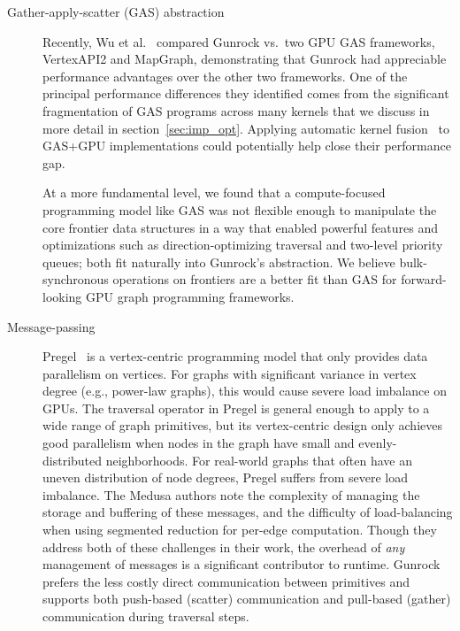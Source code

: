 \documentclass[format=acmsmall,review=false,screen=true]{acmart}
\begin{document}
\begin{description}
\item[Gather-apply-scatter (GAS) abstraction] Recently, Wu et
  al.~\cite{Wu:2015:PCF} compared Gunrock vs.\ two GPU GAS frameworks,
  VertexAPI2 and MapGraph, demonstrating that Gunrock had appreciable
  performance advantages over the other two frameworks. One of the
  principal performance differences they identified comes from the
  significant fragmentation of GAS programs across many kernels that
  we discuss in more detail in section~\ref{sec:imp_opt}. Applying
  automatic kernel fusion~\cite{Pai:2016:ACT} to GAS+GPU
  implementations could potentially help close their performance gap.

  At a more fundamental level, we found that a compute-focused
  programming model like GAS was not flexible enough to manipulate the
  core frontier data structures in a way that enabled powerful
  features and optimizations such as direction-optimizing traversal
  and two-level priority queues; both fit naturally into Gunrock's
  abstraction. We believe bulk-synchronous operations on frontiers are
  a better fit than GAS for forward-looking GPU graph programming
  frameworks.

\item[Message-passing] Pregel~\cite{Malewicz:2010:PSL} is a
  vertex-centric programming model that only provides data parallelism
  on vertices. For graphs with significant variance in vertex degree
  (e.g., power-law graphs), this would cause severe load imbalance on
  GPUs. The traversal operator in Pregel is general enough to apply to
  a wide range of graph primitives, but its vertex-centric design only
  achieves good parallelism when nodes in the graph have small and
  evenly-distributed neighborhoods. For real-world graphs that often
  have an uneven distribution of node degrees, Pregel suffers from
  severe load imbalance. The Medusa authors note the complexity of
  managing the storage and buffering of these messages, and the
  difficulty of load-balancing when using segmented reduction for
  per-edge computation. Though they address both of these challenges
  in their work, the overhead of \emph{any} management of messages is
  a significant contributor to runtime. Gunrock prefers the less
  costly direct communication between primitives and supports both
  push-based (scatter) communication and pull-based (gather)
  communication during traversal steps.


\end{description}
\end{document}
